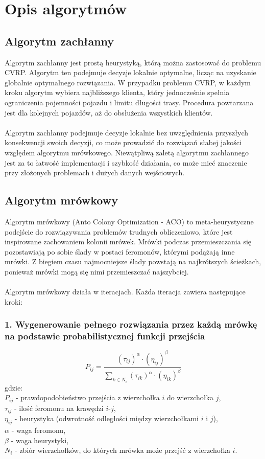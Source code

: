 \documentclass{article}
\begin{document}
\section{Opis algorytmów}
\subsection{Algorytm zachłanny}
Algorytm zachłanny jest prostą heurystyką, którą można zastosować do problemu CVRP. Algorytm ten podejmuje decyzje lokalnie optymalne, licząc na uzyskanie globalnie optymalnego rozwiązania. W  przypadku problemu CVRP, w każdym kroku algorytm wybiera najbliższego klienta, który jednocześnie spełnia ograniczenia pojemności pojazdu i limitu długości trasy. Procedura powtarzana jest dla kolejnych pojazdów, aż do obsłużenia wszystkich klientów.
\\ \\
Algorytm zachłanny podejmuje decyzje lokalnie bez uwzględnienia przyszłych konsekwencji swoich decyzji, co może prowadzić do rozwiązań słabej jakości względem algorytmu mrówkowego. Niewątpliwą zaletą algorytmu zachłannego jest za to łatwość implementacji i szybkość działania, co może mieć znaczenie przy złożonych problemach i dużych danych wejściowych.

\subsection{Algorytm mrówkowy}
Algorytm mrówkowy (Anto Colony Optimization - ACO) \cite{dorigo} to meta-heurystyczne podejście do rozwiązywania problemów trudnych obliczeniowo, które jest inspirowane zachowaniem kolonii mrówek. Mrówki podczas przemieszczania się pozostawiają po sobie ślady w postaci feromonów, którymi podążają inne mrówki. Z biegiem czasu najmocniejsze ślady powstają na najkrótszych ścieżkach, ponieważ mrówki mogą się nimi przemieszczać najszybciej.
\\ \\
Algorytm mrówkowy działa w iteracjach. Każda iteracja zawiera następujące kroki:
\subsubsection*{1. Wygenerowanie pełnego rozwiązania przez każdą mrówkę na podstawie probabilistycznej funkcji przejścia}
\begin{equation}
    P_{ij} = \frac{(\tau_{ij})^\alpha \cdot (\eta_{ij})^\beta}{\sum_{k \in N_i} (\tau_{ik})^\alpha \cdot (\eta_{ik})^\beta}
\end{equation}
gdzie:
\\
$P_{ij}$ - prawdopodobieństwo przejścia z wierzchołka $i$ do wierzchołka $j$,
\\
$\tau_{ij}$ - ilość feromonu na krawędzi $i$-$j$,
\\
$\eta_{ij}$ - heurystyka (odwrotność odległości między wierzchołkami $i$ i $j$),
\\
$\alpha$ - waga feromonu,
\\
$\beta$ - waga heurystyki,
\\
$N_i$ - zbiór wierzchołków, do których mrówka może przejść z wierzchołka $i$.
\end{document}

